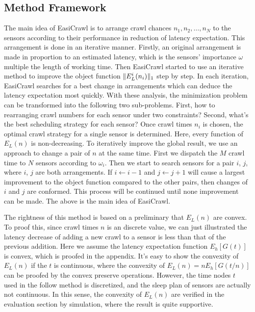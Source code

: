 \documentclass[conference]{IEEEtran}
\begin{document}
\subsection{Method Framework}
The main idea of EasiCrawl is to arrange crawl chances $n_1,n_2,\ldots,n_N$ to the sensors according to their performance in reduction of latency expectation. This arrangement is done in an iterative manner.
Firstly, an original arrangement is made in proportion to an estimated latency, which is the sensors' importance $\omega$ multiple the length of working time.
Then EasiCrawl started to use an iterative method to improve the object function $\Arrowvert E_{L}^{i}(n_{i})\Arrowvert_{1}$ step by step. 
In each iteration, EasiCrawl searches for a best change in arrangements which can deduce the latency expectation most quickly.
With these analysis, the minimization problem can be transformed into the following two sub-problems.
First, how to rearranging crawl numbers for each sensor under two constraints? Second, what's the best scheduling strategy for each sensor? 
Once crawl times $n_i$ is chosen, the optimal crawl strategy for a single sensor is determined. Here, every function of $E_L(n)$ is non-decreasing. 
To iteratively improve the global result, we use an approach to change a pair of $n$ at the same time.
First we dispatch the $M$ crawl time to $N$ sensors according to $\omega_i$. Then we start to search sensors for a pair $i$, $j$, where $i$, $j$ are both arrangements. If $i\gets i-1$ and $j\gets j+1$ will cause a largest improvement to the object function compared to the other pairs, then changes of $i$ and $j$ are conformed. This process will be continued until none improvement can be made. 
The above is the main idea of EasiCrawl.

The rightness of this method is based on a preliminary that $E_L(n)$ are convex. 
To proof this, since crawl times $n$ is an discrete value, we can just illustrated the latency decrease of adding a new crawl to a sensor is less than that of the previous addition.
Here we assume the latency expectation function $E_h[G(t)]$ is convex, which is proofed in the appendix. It's easy to show the convexity of $E_L(n)$ if the $t$ is continuous, where the convexity of $E_L(n) = n E_h[G(t/n)]$ can be proofed by the convex preserve operations. However, the time nodes $t$ used in the follow method is discretized, and the sleep plan of sensors are actually not continuous. In this sense, the convexity of $E_L(n)$ are verified in the evaluation section by simulation, where the result is quite supportive.
\end{document}
